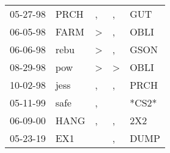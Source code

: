 \begin{supertabular}{p{0.07\textwidth}p{0.06\textwidth}p{0.02\textwidth}p{0.02\textwidth}p{0.06\textwidth}}
 05-27-98\textsuperscript{} &  PRCH\textsuperscript{} &             , &             , &   GUT\textsuperscript{} \\
 06-05-98\textsuperscript{} &  FARM\textsuperscript{} &  \textgreater &             , &  OBLI\textsuperscript{} \\
 06-06-98\textsuperscript{} &  rebu\textsuperscript{} &  \textgreater &             , &  GSON\textsuperscript{} \\
 08-29-98\textsuperscript{} &   pow\textsuperscript{} &  \textgreater &  \textgreater &  OBLI\textsuperscript{} \\
 10-02-98\textsuperscript{} &  jess\textsuperscript{} &             , &             , &  PRCH\textsuperscript{} \\
 05-11-99\textsuperscript{} &  safe\textsuperscript{} &             , &               &                   *CS2* \\
 06-09-00\textsuperscript{} &  HANG\textsuperscript{} &             , &             , &   2X2\textsuperscript{} \\
 05-23-19\textsuperscript{} &   EX1\textsuperscript{} &               &             , &  DUMP\textsuperscript{} \\
\end{supertabular}
